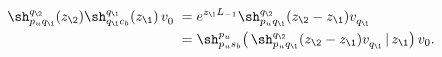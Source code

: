 \begin{equation}\label{VOid}
\begin{aligned}
\sh_{p_uq_\1}^{q_\2}(z_\2)
\sh_{q_\1c_b}^{q_\1}(z_\1)\,v_0^{}\;=\;&
e^{z_\1L_{-1}}\sh_{p_uq_\1}^{q_\2}(z_\2-z_\1)v_{q_\1}^{}\\
=\;& \sh_{p_us_b}^{p_u}\big(\,
\sh_{p_uq_\1}^{q_\2}(z_\2-z_\1)v_{q_\1}^{}\,|\,z_\1\big)\,v_0.
\end{aligned}
\end{equation}

